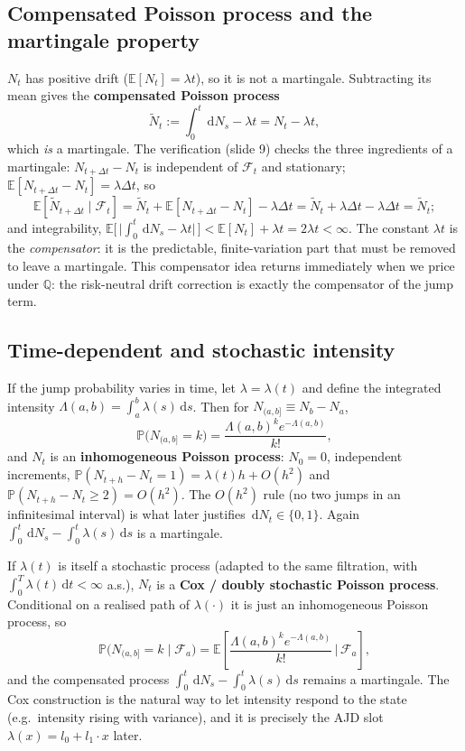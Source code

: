 \documentclass[11pt]{article}
\newcommand{\E}{\mathbb{E}}
\newcommand{\dd}{\,\mathrm{d}}
\begin{document}
\subsection{Compensated Poisson process and the martingale property}
$N_t$ has positive drift ($\E[N_t]=\lambda t$), so it is not a martingale. Subtracting its mean gives the
\textbf{compensated Poisson process}
\[
\widetilde N_t := \int_0^t \dd N_s - \lambda t = N_t-\lambda t,
\]
which \emph{is} a martingale. The verification (slide 9) checks the three ingredients of a martingale:
$N_{t+\Delta t}-N_t$ is independent of $\mathcal F_t$ and stationary; $\E[N_{t+\Delta t}-N_t]=\lambda\Delta t$,
so
\[
\E[\widetilde N_{t+\Delta t}\mid\mathcal F_t]
=\widetilde N_t + \E[N_{t+\Delta t}-N_t] - \lambda\Delta t
=\widetilde N_t + \lambda\Delta t - \lambda\Delta t = \widetilde N_t;
\]
and integrability, $\E\big[\,\big|\int_0^t \dd N_s-\lambda t\big|\,\big]<\E[N_t]+\lambda t=2\lambda t<\infty$.
The constant $\lambda t$ is the \emph{compensator}: it is the predictable, finite-variation part that must be
removed to leave a martingale. This compensator idea returns immediately when we price under $\mathbb Q$:
the risk-neutral drift correction is exactly the compensator of the jump term.

\subsection{Time-dependent and stochastic intensity}
If the jump probability varies in time, let $\lambda=\lambda(t)$ and define the integrated intensity
$\Lambda(a,b)=\int_a^b\lambda(s)\dd s$. Then for $N_{(a,b]}\equiv N_b-N_a$,
\[
\mathbb{P}\big(N_{(a,b]}=k\big)=\frac{\Lambda(a,b)^{k}e^{-\Lambda(a,b)}}{k!},
\]
and $N_t$ is an \textbf{inhomogeneous Poisson process}: $N_0=0$, independent increments,
$\mathbb{P}(N_{t+h}-N_t=1)=\lambda(t)h+O(h^2)$ and $\mathbb{P}(N_{t+h}-N_t\ge2)=O(h^2)$. The
$O(h^2)$ rule (no two jumps in an infinitesimal interval) is what later justifies $\dd N_t\in\{0,1\}$.
Again $\int_0^t\dd N_s-\int_0^t\lambda(s)\dd s$ is a martingale.

If $\lambda(t)$ is itself a stochastic process (adapted to the same filtration, with
$\int_0^T\lambda(t)\dd t<\infty$ a.s.), $N_t$ is a \textbf{Cox / doubly stochastic Poisson process}.
Conditional on a realised path of $\lambda(\cdot)$ it is just an inhomogeneous Poisson process, so
\[
\mathbb{P}\big(N_{(a,b]}=k\mid\mathcal F_a\big)
=\E\!\left[\frac{\Lambda(a,b)^{k}e^{-\Lambda(a,b)}}{k!}\,\Big|\,\mathcal F_a\right],
\]
and the compensated process $\int_0^t\dd N_s-\int_0^t\lambda(s)\dd s$ remains a martingale. The Cox
construction is the natural way to let intensity respond to the state (e.g.\ intensity rising with
variance), and it is precisely the AJD slot $\lambda(x)=l_0+l_1\cdot x$ later.
\end{document}
